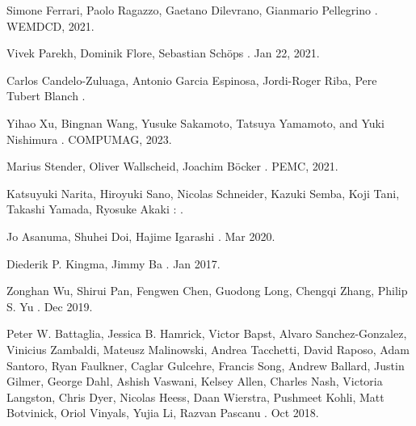 \documentclass{report} %
\begin{document}
\begin{thebibliography}{00}
    \newblock Simone Ferrari, Paolo Ragazzo, Gaetano Dilevrano, Gianmario Pellegrino
    .
    \newblock WEMDCD, 2021.

    \newblock Vivek Parekh, Dominik Flore, Sebastian Schöps
    .
    \newblock Jan 22, 2021.

    \newblock Carlos Candelo-Zuluaga, Antonio Garcia Espinosa, Jordi-Roger Riba, Pere Tubert Blanch
    .
    
    \newblock Yihao Xu, Bingnan Wang, Yusuke Sakamoto, Tatsuya Yamamoto, and Yuki Nishimura
    .
    \newblock COMPUMAG, 2023.

    \newblock Marius Stender, Oliver Wallscheid, Joachim Böcker
    .
    \newblock PEMC, 2021.

    \newblock Katsuyuki Narita, Hiroyuki Sano, Nicolas Schneider, Kazuki Semba, Koji Tani, Takashi Yamada, Ryosuke Akaki
    :
    .
    
    \newblock Jo Asanuma, Shuhei Doi, Hajime Igarashi
    .
     Mar 2020.

    \newblock Diederik P. Kingma, Jimmy Ba
    .
     Jan 2017.

    \newblock Zonghan Wu, Shirui Pan, Fengwen Chen, Guodong Long, Chengqi Zhang, Philip S. Yu
    .
     Dec 2019.

    \newblock Peter W. Battaglia, Jessica B. Hamrick, Victor Bapst, Alvaro Sanchez-Gonzalez, Vinicius Zambaldi, Mateusz Malinowski, Andrea Tacchetti, David Raposo, 
    Adam Santoro, Ryan Faulkner, Caglar Gulcehre, Francis Song, Andrew Ballard, Justin Gilmer, George Dahl, Ashish Vaswani, Kelsey Allen, Charles Nash,
    Victoria Langston, Chris Dyer, Nicolas Heess, Daan Wierstra, Pushmeet Kohli, Matt Botvinick, Oriol Vinyals, Yujia Li, Razvan Pascanu
    .
     Oct 2018.


\end{thebibliography}
\end{document}

